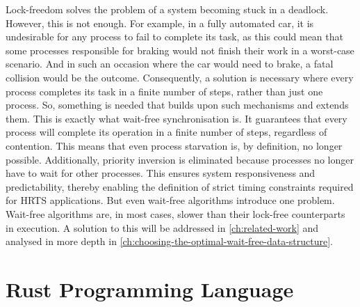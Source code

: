 Lock-freedom solves the problem of a system becoming stuck in a deadlock. However, this is not enough. For example, in a fully automated car, it is undesirable for any process to fail to complete its task, as this could mean that some processes responsible for braking would not finish their work in a worst-case scenario. And in such an occasion where the car would need to brake, a fatal collision would be the outcome. Consequently, a solution is necessary where every process completes its task in a finite number of steps, rather than just one process. So, something is needed that builds upon such mechanisms and extends them. This is exactly what wait-free synchronisation is. It guarantees that every process will complete its operation in a finite number of steps, regardless of contention. This means that even process starvation is, by definition, no longer possible. Additionally, priority inversion is eliminated because processes no longer have to wait for other processes. This ensures system responsiveness and predictability, thereby enabling the definition of strict timing constraints required for \ac{HRTS} applications. But even wait-free algorithms introduce one problem. Wait-free algorithms are, in most cases, slower than their lock-free counterparts in execution. A solution to this will be addressed in \cref{ch:related-work} and analysed in more depth in \cref{ch:choosing-the-optimal-wait-free-data-structure}.

\section{Rust Programming Language}\label{sec:rust}

